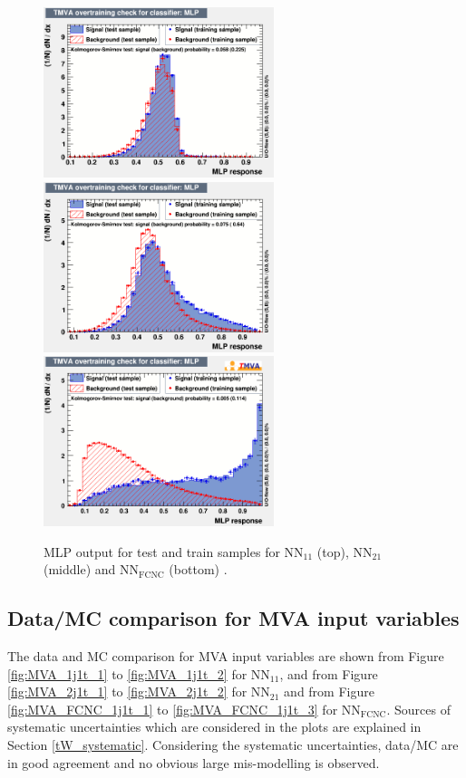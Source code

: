 \begin{figure}[ht]
  \begin{center}
      \includegraphics[width=0.6\textwidth]{figures/tW/fig/MVA/MLP_1j1b/MLP.png}
      \includegraphics[width=0.6\textwidth]{figures/tW/fig/MVA/MLP_2j1b/MLP.png}
      \includegraphics[width=0.6\textwidth]{figures/tW/fig/MVA/MLP_FCNC/MLP.png}
    \caption{MLP output for test and train samples for NN$_{11}$ (top), NN$_{21}$ (middle) and NN$_{\text{FCNC}}$ (bottom) .}
    \label{fig:MLP_response}
  \end{center}
\end{figure}




\subsection{Data/MC comparison for MVA input variables}
\label{MVA_input_variables}
The data and MC comparison for MVA input variables are shown from Figure \ref{fig:MVA_1j1t_1} to \ref{fig:MVA_1j1t_2} for NN$_{11}$, and from Figure \ref{fig:MVA_2j1t_1} to \ref{fig:MVA_2j1t_2} for NN$_{21}$ and from Figure \ref{fig:MVA_FCNC_1j1t_1} to \ref{fig:MVA_FCNC_1j1t_3} for NN$_{\text{FCNC}}$.
Sources of systematic uncertainties which are considered in the plots are explained in Section \ref{tW_systematic}.
Considering the systematic uncertainties, data/MC are in good agreement and no obvious large mis-modelling is observed.


